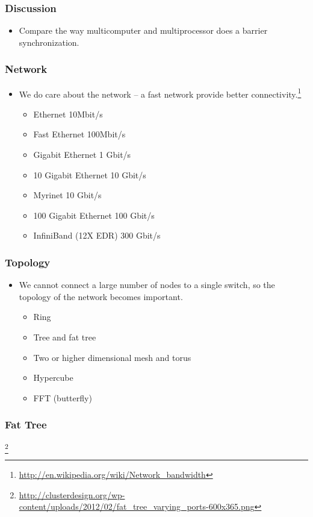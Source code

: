 \documentclass{beamer}
\begin{document}
\begin{CJK}{UTF8}{bsmi}
\begin{frame}
\frametitle{Discussion}
\begin{itemize}
\item Compare the way multicomputer and multiprocessor does a barrier
 synchronization.
\end{itemize}
\end{frame}



\begin{frame}
\frametitle{Network}
\begin{itemize}
\item We do care about the network -- a fast network provide better
  connectivity.\footnote{\url{http://en.wikipedia.org/wiki/Network_bandwidth}}
\begin{itemize}
\item Ethernet 10Mbit/s
\item Fast Ethernet 100Mbit/s
\item Gigabit Ethernet 1 Gbit/s
\item 10 Gigabit Ethernet 10  Gbit/s
\item Myrinet 10 Gbit/s
\item 100 Gigabit Ethernet 100 Gbit/s
\item InfiniBand (12X EDR) 300 Gbit/s
\end{itemize}

\end{itemize}
\end{frame}

\begin{frame}
\frametitle{Topology}
\begin{itemize}
\item We cannot connect a large number of nodes to a single switch, so
  the topology of the network becomes important.
\begin{itemize}
\item Ring
\item Tree and fat tree
\item Two or higher dimensional mesh and torus
\item Hypercube
\item FFT (butterfly)
\end{itemize}
\end{itemize}
\end{frame}

\begin{frame}
\frametitle{Fat Tree}
\centerline{}
\footnote{\url{http://clusterdesign.org/wp-content/uploads/2012/02/fat_tree_varying_ports-600x365.png}}
\end{frame}


\end{CJK}
\end{document}
